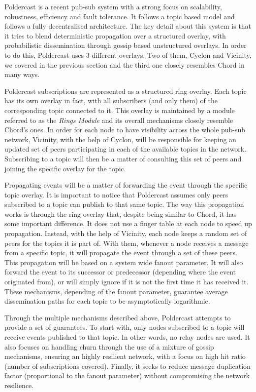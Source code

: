 Poldercast \cite{Setty2012} is a recent pub-sub system with
a strong focus on scalability, robustness, efficiency and fault
tolerance. It follows a topic based model and follows a fully
decentralised architecture. The key detail about this system is that it
tries to blend deterministic propagation over a structured overlay, with
probabilistic dissemination through gossip based unstructured overlays.
In order to do this, Poldercast uses 3 different overlays. Two of them,
Cyclon and Vicinity, we covered in the previous section and the third
one closely resembles Chord in many ways.

Poldercast subscriptions are represented as a structured ring overlay.
Each topic has its own overlay in fact, with all subscribers (and only
them) of the corresponding topic connected to it. This overlay is
maintained by a module referred to as the \emph{Rings Module} and its
overall mechanisms closely resemble Chord's ones. In order for each node
to have visibility across the whole pub-sub network, Vicinity, with the
help of Cyclon, will be responsible for keeping an updated set of peers
participating in each of the available topics in the network.
Subscribing to a topic will then be a matter of consulting this set of
peers and joining the specific overlay for the topic.

Propagating events will be a matter of forwarding the event through the
specific topic overlay. It is important to notice that Poldercast
assumes only peers subscribed to a topic can publish to that same topic.
The way this propagation works is through the ring overlay that, despite
being similar to Chord, it has some important difference. It does not
use a finger table at each node to speed up propagation. Instead, with
the help of Vicinity, each node keeps a random set of peers for the
topics it is part of. With them, whenever a node receives a message from
a specific topic, it will propagate the event through a set of these
peers. This propagation will be based on a system wide fanout parameter.
It will also forward the event to its successor or predecessor
(depending where the event originated from), or will simply ignore if it
is not the first time it has received it. These mechanisms, depending of
the fanout parameter, guarantee average dissemination paths for each
topic to be asymptotically logarithmic.

Through the multiple mechanisms described above, Poldercast attempts to
provide a set of guarantees. To start with, only nodes subscribed to a
topic will receive events published to that topic. In other words, no
relay nodes are used. It also focuses on handling churn through the use
of a mixture of gossip mechanisms, ensuring an highly resilient network,
with a focus on high hit ratio (number of subscriptions covered).
Finally, it seeks to reduce message duplication factor (proportional to
the fanout parameter) without compromising the network resilience.

